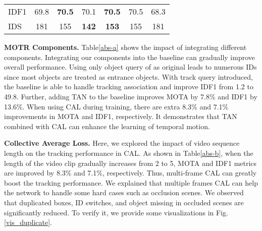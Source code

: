 \documentclass[runningheads]{llncs}
\begin{document}
\begin{table}[t]
{{{\begin{tabular}{l|ccc|ccc}
          IDF1  & 69.8 & \textbf{70.5} & 70.1         & \textbf{70.5} & 70.5 & 68.3 \\
          IDS & 181  & 155           & \textbf{142} & \textbf{153}  & 155           & 181  \\
          \hline
        \end{tabular}
      }}}
  \hspace{0.02\linewidth}\vspace{-1mm}
   \vspace{-1mm}
  \label{tab:abs}
\end{table}



\noindent \textbf{MOTR Components.}
Table\;\ref{abs-a} shows the impact of integrating different components. Integrating our components into the baseline can gradually improve overall performance. Using only object query of as original leads to numerous IDs since most objects are treated as entrance objects. With track query introduced, the baseline is able to handle tracking association and improve IDF1 from 1.2 to 49.8. Further, adding TAN to the baseline improves MOTA by 7.8\% and IDF1 by 13.6\%. When using CAL during training, there are extra 8.3\% and 7.1\% improvements in MOTA and IDF1, respectively. It demonstrates that TAN combined with CAL can enhance the learning of temporal motion.

\noindent \textbf{Collective Average Loss.} Here, we explored the impact of video sequence length on the tracking performance in CAL. As shown in Table\;\ref{abs-b}, when the length of the video clip gradually increases from 2 to 5, MOTA and IDF1 metrics are improved by 8.3\% and 7.1\%, respectively. Thus, multi-frame CAL can greatly boost the tracking performance. We explained that multiple frames CAL can help the network to handle some hard cases such as occlusion scenes. We observed that duplicated boxes, ID switches, and object missing in occluded scenes are significantly reduced. To verify it, we provide some visualizations in Fig.\;\ref{vis_duplicate}.
\end{document}
